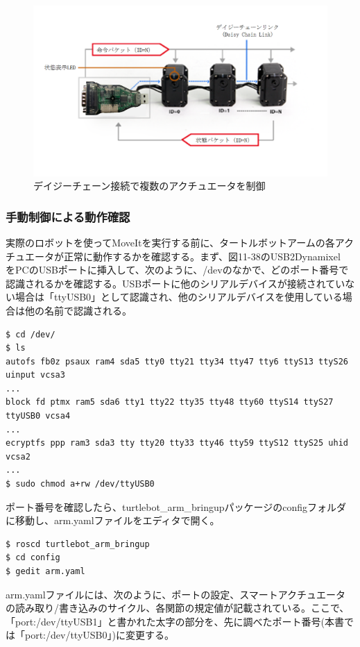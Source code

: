 \begin{figure}[htp]
  \centering
  \includegraphics[width=12cm]{pictures/chapter11/pic_11_39.png}
  \caption{デイジーチェーン接続で複数のアクチュエータを制御}
\end{figure}

\subsubsection{手動制御による動作確認}

実際のロボットを使ってMoveItを実行する前に、タートルボットアームの各アクチュエータが正常に動作するかを確認する。まず、図11-38のUSB2Dynamixel\\をPCのUSBポートに挿入して、次のように、/devのなかで、どのポート番号で認識されるかを確認する。USBポートに他のシリアルデバイスが接続されていない場合は「ttyUSB0」として認識され、他のシリアルデバイスを使用している場合は他の名前で認識される。

\begin{lstlisting}[language=ROS]
$ cd /dev/
$ ls
autofs fb0z psaux ram4 sda5 tty0 tty21 tty34 tty47 tty6 ttyS13 ttyS26 uinput vcsa3
...
block fd ptmx ram5 sda6 tty1 tty22 tty35 tty48 tty60 ttyS14 ttyS27 ttyUSB0 vcsa4
...
ecryptfs ppp ram3 sda3 tty tty20 tty33 tty46 tty59 ttyS12 ttyS25 uhid vcsa2
...
$ sudo chmod a+rw /dev/ttyUSB0
\end{lstlisting}

ポート番号を確認したら、turtlebot\_arm\_bringupパッケージのconfigフォルダに移動し、arm.yamlファイルをエディタで開く。

\begin{lstlisting}[language=ROS]
$ roscd turtlebot_arm_bringup
$ cd config
$ gedit arm.yaml
\end{lstlisting}

arm.yamlファイルには、次のように、ポートの設定、スマートアクチュエータの読み取り/書き込みのサイクル、各関節の規定値が記載されている。ここで、「port:/dev/ttyUSB1」と書かれた太字の部分を、先に調べたポート番号(本書では「port:/dev/ttyUSB0」)に変更する。

